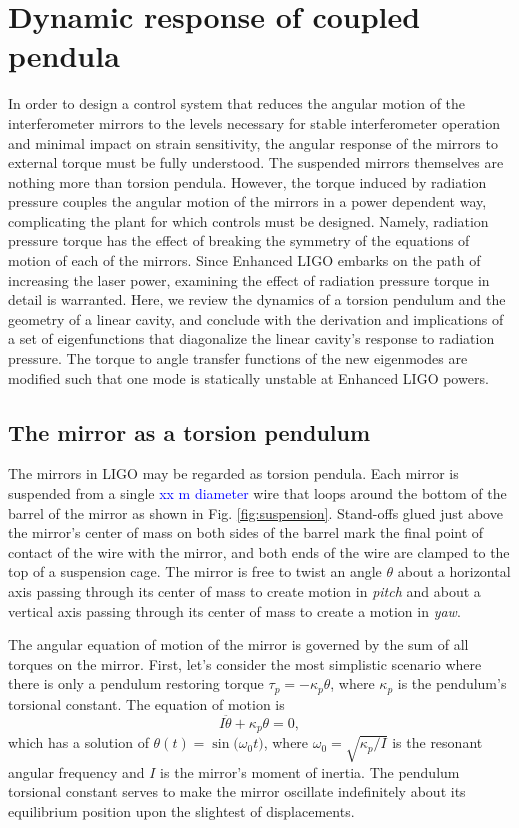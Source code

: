 \chapter{Dynamic response of coupled pendula}
In order to design a control system that reduces the angular motion of
the interferometer mirrors to the levels necessary for stable
interferometer operation and minimal impact on strain sensitivity, the
angular response of the mirrors to external torque must be fully
understood. The suspended mirrors themselves are nothing more than
torsion pendula. However, the torque induced by radiation pressure
couples the angular motion of the mirrors in a power dependent way,
complicating the plant for which controls must be designed. Namely,
radiation pressure torque has the effect of breaking the symmetry of
the equations of motion of each of the mirrors. Since Enhanced LIGO
embarks on the path of increasing the laser power, examining the
effect of radiation pressure torque in detail is warranted. Here, we
review the dynamics of a torsion pendulum and the geometry of a linear
cavity, and conclude with the derivation and implications of a set of
eigenfunctions that diagonalize the linear cavity's response to
radiation pressure. The torque to angle transfer functions of the new
eigenmodes are modified such that one mode is statically unstable at
Enhanced LIGO powers. 



\section{The mirror as a torsion pendulum}
\label{sec:pendTF}
The mirrors in LIGO may be regarded as torsion pendula. Each mirror is
suspended from a single \textcolor{blue}{xx m diameter} wire that
loops around the bottom of the barrel of the mirror as shown in
Fig. \ref{fig:suspension}. Stand-offs glued just above the mirror's
center of mass on both sides of the barrel mark the final point of
contact of the wire with the mirror, and both ends of the wire are
clamped to the top of a suspension cage. The mirror is free to twist
an angle $\theta$ about a horizontal axis passing through its center
of mass to create motion in \emph{pitch} and about a vertical axis
passing through its center of mass to create a motion in \emph{yaw}.

The angular equation of motion of the mirror is governed by the sum of
all torques on the mirror. First, let's consider the most simplistic
scenario where there is only a pendulum restoring torque
$\tau_p=-\kappa_p \theta$, where $\kappa_p$ is the pendulum's
torsional constant. The equation of motion is
\begin{equation}
I \ddot{\theta} + \kappa_p \theta = 0,
\end{equation}
which has a solution of $\theta(t) = \sin({\omega_0 t)}$, where
$\omega_0 = \sqrt{\kappa_p/I}$ is the resonant angular frequency and
$I$ is the mirror's moment of inertia. The pendulum torsional constant
serves to make the mirror oscillate indefinitely about its equilibrium
position upon the slightest of displacements.

